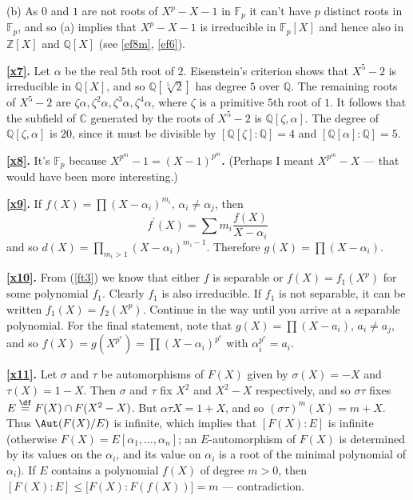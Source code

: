 \documentclass[a4paper,11pt,final,openany]{memoir}
\theoremstyle{nonumberplain}
\begin{document}
(b) As $0$ and $1$ are not roots of $X^{p}-X-1$ in $\mathbb{F}_{p}$ it can't
have $p$ distinct roots in $\mathbb{F}{}_{p}$, and so (a) implies that
$X^{p}-X-1$ is irreducible in $\mathbb{F}_{p}[X]$ and hence also in
$\mathbb{Z}[X]$ and $\mathbb{Q}{}[X]$ (see \ref{ef8m}, \ref{ef6}).

\medskip\noindent\textbf{\ref{x7}.} Let $\alpha$ be the real $5$th root of
$2$. Eisenstein's criterion shows that $X^{5}-2$ is irreducible in
${\mathbb{Q}}[X]$, and so ${\mathbb{Q}}[\sqrt[5]{2}]$ has degree $5$ over
${\mathbb{Q}}$. The remaining roots of $X^{5}-2$ are $\zeta\alpha,\zeta
^{2}\alpha,\zeta^{3}\alpha,\zeta^{4}\alpha$, where $\zeta$ is a primitive
$5$th root of $1$. It follows that the subfield of $\mathbb{C}$ generated by
the roots of $X^{5}-2$ is ${\mathbb{Q}}[\zeta,\alpha]$. The degree of
${\mathbb{Q}}[\zeta,\alpha]$ is $20$, since it must be divisible by
$[{\mathbb{Q}}[\zeta]\colon{\mathbb{Q}}]=4$ and $[{\mathbb{Q}}[\alpha
]\colon{\mathbb{Q}}]=5$.

\medskip\noindent\textbf{\ref{x8}.} It's $\mathbb{F}_{p}$ because $X^{p^{m}%
}-1=(X-1)^{p^{m}}$\textbf{.} (Perhaps I meant $X^{p^{m}}-X$ --- that would
have been more interesting.)

\medskip\noindent\textbf{\ref{x9}.} If $f(X)=\prod(X-\alpha_{i})^{m_{i}}$,
$\alpha_{i}\neq\alpha_{j}$, then
\[
f^{\prime}(X)=\sum m_{i}\frac{f(X)}{X-\alpha_{i}}%
\]
and so $d(X)=\prod_{m_{i}>1}(X-\alpha_{i})^{m_{i}-1}$. Therefore $g(X)
=\prod(X-\alpha_{i})$.

\medskip\noindent\textbf{\ref{x10}.} From (\ref{ft3}) we know that either $f$
is separable or $f(X)=f_{1}(X^{p})$ for some polynomial $f_{1}$. Clearly
$f_{1}$ is also irreducible. If $f_{1}$ is not separable, it can be written
$f_{1}(X)=f_{2}(X^{p})$. Continue in the way until you arrive at a separable
polynomial. For the final statement, note that $g(X)=\prod(X-a_{i})$,
$a_{i}\neq a_{j}$, and so $f(X)=g(X^{p^{e}})=\prod(X-\alpha_{i})^{p^{e}}$ with
$\alpha_{i}^{p^{e}}=a_{i}$.

\medskip\noindent\textbf{\ref{x11}.} Let $\sigma$ and $\tau$ be automorphisms
of $F(X)$ given by $\sigma(X)=-X$ and $\tau(X)=1-X$. Then $\sigma$ and $\tau$
fix $X^{2}$ and $X^{2}-X$ respectively, and so $\sigma\tau$ fixes
$E\overset{\df}{=}F(X)\cap F(X^{2}-X)$. But $\alpha\tau
X=1+X$, and so $(\sigma\tau)^{m}(X)=m+X$. Thus $\Aut(F(X)/E)$ is infinite,
which implies that $[F(X)\colon E]$ is infinite (otherwise $F(X)=E[\alpha
_{1},\ldots,\alpha_{n}]$; an $E$-automorphism of $F(X)$ is determined by its
values on the $\alpha_{i}$, and its value on $\alpha_{i}$ is a root of the
minimal polynomial of $\alpha_{i}$). If $E$ contains a polynomial $f(X)$ of
degree $m>0$, then $[F(X)\colon E]\leq\lbrack F(X)\colon F(f(X))]=m$ --- contradiction.
\end{document}
